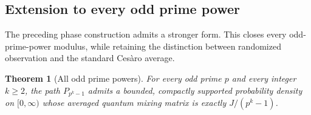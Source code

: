 \documentclass[11pt,a4paper]{article}
\newtheorem{theorem}{Theorem}[section]
\theoremstyle{definition}\newtheorem{definition}[theorem]{Definition}
\theoremstyle{remark}\newtheorem{remark}[theorem]{Remark}
\begin{document}
\subsection{Extension to every odd prime power}
\label{sec:odd-prime-power-uam}

The preceding phase construction admits a stronger form. This closes
every odd-prime-power modulus, while retaining the distinction between
randomized observation and the standard Ces\`aro average.

\begin{theorem}[All odd prime powers]
\label{thm:prime-power-uam}
For every odd prime $p$ and every integer $k\ge2$, the path
$P_{p^k-1}$ admits a bounded, compactly supported probability density
on $[0,\infty)$ whose averaged quantum mixing matrix is exactly
$J/(p^k-1)$.
\end{theorem}
\end{document}
